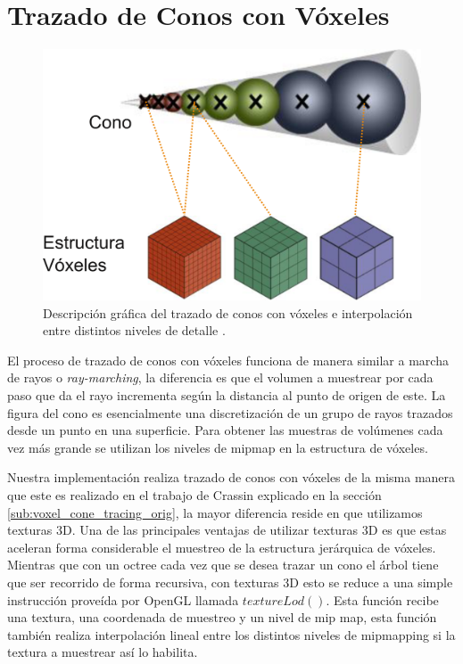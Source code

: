 \section{Trazado de Conos con Vóxeles} %

\label{sec:trazado_de_conos_con_voxeles}

\begin{figure}
	\includegraphics[width=0.95\linewidth]{media/vct_explain.png}
	\caption{Descripción gráfica del trazado de conos con vóxeles e interpolación entre distintos niveles de detalle \cite{Oliver:2012:UEE:2341836.2341909}.}
	\label{fig:vct_explain}
\end{figure}

El proceso de trazado de conos con vóxeles funciona de manera similar a marcha de rayos o \emph{ray-marching}, la diferencia es que el volumen a muestrear por cada paso que da el rayo incrementa según la distancia al punto de origen de este. La figura del cono es esencialmente una discretización de un grupo de rayos trazados desde un punto en una superficie. Para obtener las muestras de volúmenes cada vez más grande se utilizan los niveles de mipmap en la estructura de vóxeles.

Nuestra implementación realiza trazado de conos con vóxeles de la misma manera que este es realizado en el trabajo de Crassin explicado en la sección \ref{sub:voxel_cone_tracing_orig}, la mayor diferencia reside en que utilizamos texturas 3D. Una de las principales ventajas de utilizar texturas 3D es que estas aceleran forma considerable el muestreo de la estructura jerárquica de vóxeles. Mientras que con un octree cada vez que se desea trazar un cono el árbol tiene que ser recorrido de forma recursiva, con texturas 3D esto se reduce a una simple instrucción proveída por OpenGL llamada $textureLod()$. Esta función recibe una textura, una coordenada de muestreo y un nivel de mip map, esta función también realiza interpolación lineal entre los distintos niveles de mipmapping si la textura a muestrear así lo habilita.
